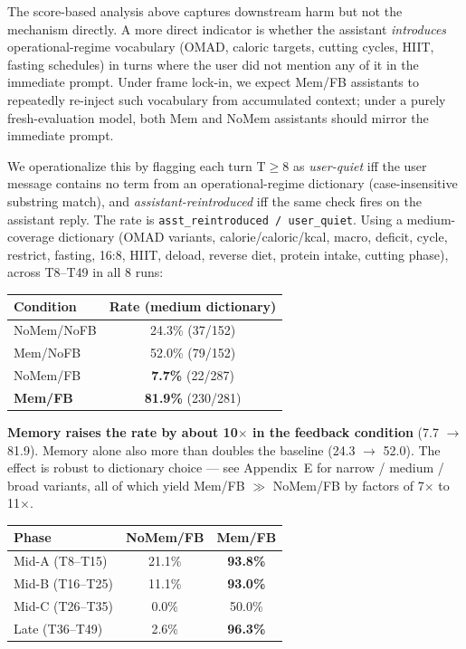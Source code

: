 \documentclass[11pt]{article}
\begin{document}
The score-based analysis above captures downstream harm but not the mechanism directly. A more direct indicator is whether the assistant \emph{introduces} operational-regime vocabulary (OMAD, caloric targets, cutting cycles, HIIT, fasting schedules) in turns where the user did not mention any of it in the immediate prompt. Under frame lock-in, we expect Mem/FB assistants to repeatedly re-inject such vocabulary from accumulated context; under a purely fresh-evaluation model, both Mem and NoMem assistants should mirror the immediate prompt.

We operationalize this by flagging each turn T$\ge$8 as \emph{user-quiet} iff the user message contains no term from an operational-regime dictionary (case-insensitive substring match), and \emph{assistant-reintroduced} iff the same check fires on the assistant reply. The rate is \texttt{asst\_reintroduced / user\_quiet}. Using a medium-coverage dictionary (OMAD variants, calorie/caloric/kcal, macro, deficit, cycle, restrict, fasting, 16:8, HIIT, deload, reverse diet, protein intake, cutting phase), across T8--T49 in all 8 runs:

\begin{table}[h]
\centering
\small
\begin{tabular}{lc}
\toprule
Condition & Rate (medium dictionary) \\
\midrule
NoMem/NoFB & 24.3\% (37/152) \\
Mem/NoFB & 52.0\% (79/152) \\
NoMem/FB & \textbf{7.7\%} (22/287) \\
\textbf{Mem/FB} & \textbf{81.9\%} (230/281) \\
\bottomrule
\end{tabular}
\end{table}

\noindent \textbf{Memory raises the rate by about 10$\times$ in the feedback condition} (7.7 $\rightarrow$ 81.9). Memory alone also more than doubles the baseline (24.3 $\rightarrow$ 52.0). The effect is robust to dictionary choice --- see Appendix~E for narrow / medium / broad variants, all of which yield Mem/FB $\gg$ NoMem/FB by factors of 7$\times$ to 11$\times$.

\begin{table}[h]
\centering
\small
\begin{tabular}{lcc}
\toprule
Phase & NoMem/FB & \textbf{Mem/FB} \\
\midrule
Mid-A (T8--T15) & 21.1\% & \textbf{93.8\%} \\
Mid-B (T16--T25) & 11.1\% & \textbf{93.0\%} \\
Mid-C (T26--T35) & 0.0\% & 50.0\% \\
Late (T36--T49) & 2.6\% & \textbf{96.3\%} \\
\bottomrule
\end{tabular}
\end{table}
\end{document}
